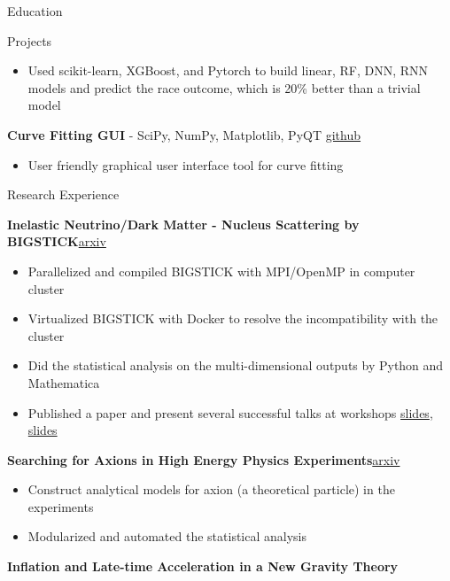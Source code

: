\documentclass{resume}
\begin{document}
\begin{rSection}{Education}
\begin{rSection}{Projects}
\begin{itemize}
        \item Used scikit-learn, XGBoost, and Pytorch to build linear, RF, DNN, RNN models and predict the race outcome, which is 20\% better than a trivial model
        \end{itemize}
    \item \textbf{Curve Fitting GUI} - {SciPy, NumPy, Matplotlib, PyQT} \hfill {\href{https://github.com/noctildon/curve_fitting}{github}}
        \begin{itemize}
        \itemsep -3pt {}
        \item User friendly graphical user interface tool for curve fitting
        \end{itemize}
\end{rSection}



\begin{rSection}{Research Experience}
\vspace{-1.25em}
\item \textbf{Inelastic Neutrino/Dark Matter - Nucleus Scattering by BIGSTICK}\hfill \href{https://arxiv.org/pdf/2206.08590.pdf}{arxiv}
    \begin{itemize}
    \itemsep -3pt {}
    \item Parallelized and compiled BIGSTICK with MPI/OpenMP in computer cluster
    \item Virtualized BIGSTICK with Docker to resolve the incompatibility with the cluster
    \item Did the statistical analysis on the multi-dimensional outputs by Python and Mathematica
    \item Published a paper and present several successful talks at workshops \href{https://noctildon.github.io/physics/Phenon_2022.pdf}{slides}, \href{https://noctildon.github.io/physics/Plains_2022.pdf}{slides}
    \end{itemize}
    \item \textbf{Searching for Axions in High Energy Physics Experiments}\hfill \href{https://arxiv.org/pdf/2207.13659.pdf}{arxiv}
    \begin{itemize}
    \itemsep -3pt {}
    \item Construct analytical models for axion (a theoretical particle) in the experiments
    \item Modularized and automated the statistical analysis
    \end{itemize}
\item \textbf{Inflation and Late-time Acceleration in a New Gravity Theory}

\end{rSection}
\end{rSection}
\end{document}
